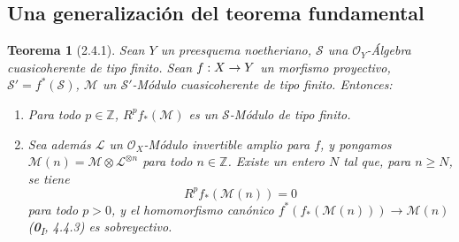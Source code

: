 \documentclass[10pt,oneside,openany]{book}
\theoremstyle{egaenv}\newtheorem*{env}{---}
\theoremstyle{egastatement}
\newtheorem*{theorem}{Teorema}
\theoremstyle{egadescription}
\renewcommand{\geq}{\geqslant}
\renewcommand{\to}{\mathchoice{\longrightarrow}{\rightarrow}{\rightarrow}{\rightarrow}}
\begin{document}
\subsection{Una generalización del teorema fundamental}
\label{subsection:III.2.4}
\label{subsection:III.2.4-fr}

\begin{theorem}[2.4.1]
\label{III.2.4.1-fr}
Sean $Y$ un preesquema noetheriano, $\mathcal S$ una
$\mathcal O_Y$-Álgebra cuasicoherente de tipo finito. Sean
$f:X\to Y$ un morfismo proyectivo, $\mathcal S'=f^*(\mathcal S)$,
$\mathcal M$ un $\mathcal S'$-Módulo cuasicoherente de tipo finito.
Entonces:
\begin{enumerate}
\item[\textup{(i)}] Para todo $p\in\mathbb Z$, $R^pf_*(\mathcal M)$ es un
$\mathcal S$-Módulo de tipo finito.
\item[\textup{(ii)}] Sea además $\mathcal L$ un $\mathcal O_X$-Módulo invertible
amplio para $f$, y pongamos
$\mathcal M(n)=\mathcal M\otimes\mathcal L^{\otimes n}$ para todo
$n\in\mathbb Z$. Existe un entero $N$ tal que, para $n\geq N$, se tiene
\[
R^pf_*(\mathcal M(n))=0
\tag{2.4.1.1}\label{III.2.4.1.1-fr}
\]
para todo $p>0$, y el homomorfismo canónico
$f^*(f_*(\mathcal M(n)))\longrightarrow\mathcal M(n)$
\textup{(\textbf{0}\textsubscript{I}, 4.4.3)} es sobreyectivo.
\end{enumerate}
\end{theorem}
\end{document}
